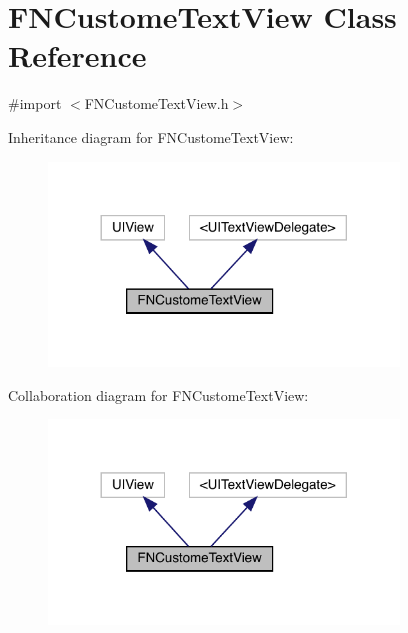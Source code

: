 \hypertarget{interface_f_n_custome_text_view}{}\section{F\+N\+Custome\+Text\+View Class Reference}
\label{interface_f_n_custome_text_view}


{\ttfamily \#import $<$F\+N\+Custome\+Text\+View.\+h$>$}



Inheritance diagram for F\+N\+Custome\+Text\+View\+:\nopagebreak
\begin{figure}[H]
\begin{center}
\leavevmode
\includegraphics[width=264pt]{interface_f_n_custome_text_view__inherit__graph}
\end{center}
\end{figure}


Collaboration diagram for F\+N\+Custome\+Text\+View\+:\nopagebreak
\begin{figure}[H]
\begin{center}
\leavevmode
\includegraphics[width=264pt]{interface_f_n_custome_text_view__coll__graph}
\end{center}
\end{figure}

